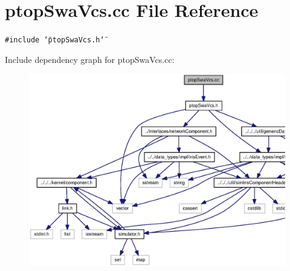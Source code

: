 \section{ptopSwaVcs.cc File Reference}
\label{ptopSwaVcs_8cc}
{\tt \#include \char`\"{}ptopSwaVcs.h\char`\"{}}\par


Include dependency graph for ptopSwaVcs.cc:\nopagebreak
\begin{figure}[H]
\begin{center}
\leavevmode
\includegraphics[width=361pt]{ptopSwaVcs_8cc__incl}
\end{center}
\end{figure}
